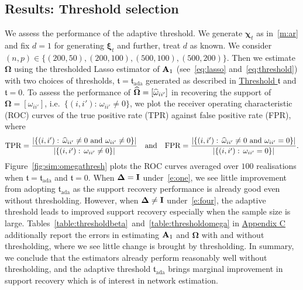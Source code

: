 \subsection{Results: Threshold selection}

We assess the performance of the adaptive threshold.
We generate $\bm\chi_t$ as in~\ref{m:ar} and fix $d = 1$ for generating $\bm\xi_t$ and further, treat $d$ as known.
We consider $(n, p) \in \{(200, 50), (200, 100), (500, 100), (500, 200)\}$. 
Then we estimate $\bm\Omega$ using the thresholded Lasso estimator of $\mathbf A_1$ (see~\eqref{eq:lasso} and~\eqref{eq:threshold}) with two choices of thresholds, $\mathfrak{t} = \mathfrak{t}_{\text{ada}}$ generated as described in \hyperref[sec:tuning:thresh]{Threshold $\mathfrak{t}$} and $\mathfrak{t} = 0$.
To assess the performance of $\widehat{\bm\Omega} = [\widehat \omega_{ii'}]$ in recovering the support of $\bm\Omega = [\omega_{ii'}]$, i.e.\ $\{(i, i'): \, \omega_{ii'} \ne 0 \}$, we plot the receiver operating characteristic (ROC) curves of the true positive rate (TPR) against false positive rate (FPR), where
\begin{align*}
\text{TPR} = \frac{ \vert \{ (i, i'): \, \widehat \omega_{ii'} \ne 0 \text{ and } \omega_{ii'} \ne 0 \} \vert }{\vert \{ (i, i'): \, \omega_{ii'} \ne 0 \} \vert}
\quad \text{and} \quad
\text{FPR} = \frac{ \vert \{ (i, i'): \, \widehat \omega_{ii'} \ne 0 \text{ and } \omega_{ii'} = 0 \} \vert }{\vert \{ (i, i'): \, \omega_{ii'} = 0 \} \vert}.
\end{align*}
Figure~\ref{fig:sim:omegathresh} plots the ROC curves averaged over $100$ realisations when $\mathfrak{t} = \mathfrak{t}_{\text{ada}}$ and $\mathfrak{t} = 0$.
When $\bm\Delta = \mathbf I$ under~\ref{e:one}, we see little improvement from adopting $\mathfrak{t}_{\text{ada}}$ as the support recovery performance is already good even without thresholding.
However, when $\bm\Delta \ne \mathbf I$ under~\ref{e:four}, the adaptive threshold leads to improved support recovery especially when the sample size is large. 
Tables~\ref{table:thresholdbeta}~and~\ref{table:thresholdomega} in \hyperref[sec:appendix:sim]{Appendix C} additionally report the errors in estimating $\mathbf A_1$ and $\bm\Omega$ with and without thresholding, where we see little change is brought by thresholding.
In summary, we conclude that the estimators already perform reasonably well without thresholding, and the adaptive threshold $\mathfrak{t}_{\text{ada}}$ brings marginal improvement in support recovery which is of interest in network estimation.

